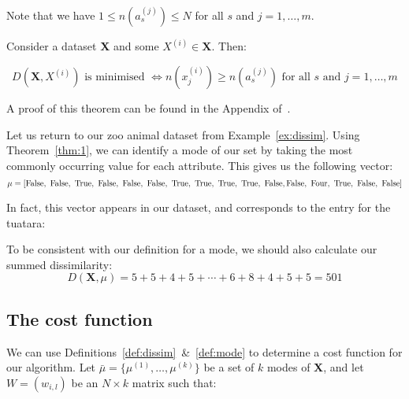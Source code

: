 \begin{remark}
    Note that we have \(1 \le n(a_s^{(j)}) \le N\) for all \(s\) and \(j = 1, 
    \ldots, m\).\\
\end{remark}

\begin{theorem}\label{thm:1}
    Consider a dataset \textbf{X} and some \(X^{(i)} \in \textbf{X}\). Then:
	
    \[
	    D(\textbf{X}, X^{(i)}) \text{ is minimised } \iff n(x_j^{(i)}) \geq 
	    n(a_s^{(j)}) \text{ for all } s \text{ and } j = 1, \ldots, m 
	\]
\end{theorem}
A proof of this theorem can be found in the Appendix of~\cite{Huang98}.\\

\begin{example}\label{ex:mode}
    Let us return to our zoo animal dataset from Example~\ref{ex:dissim}. Using 
    Theorem~\ref{thm:1}, we can identify a mode of our set by taking the most 
    commonly occurring value for each attribute. This gives us the following 
    vector:
    \[
        \mu = \left[\false, \ \false, \ \true, \ \false, \ \false, \ \false, \
        \true, \ \true, \ \true, \ \true, \ \false, \false, \ \text{Four}, \ 
        \true, \ \false, \ \false\right]
    \]

    In fact, this vector appears in our dataset, and corresponds to the entry 
    for the tuatara:
    
    \begin{table}[h]
        \resizebox{\textwidth}{!}{%
        \centering
        \label{tab:tuatara}
    }
    \end{table}

    To be consistent with our definition for a mode, we should also calculate 
    our summed dissimilarity:
    \[
        D(\textbf{X}, \mu) = 5 + 5 + 4 + 5 + \cdots + 6 + 8 + 4 + 5 + 5 = 501
    \]
\end{example}

\subsection{The cost function}\label{subsec:cost}

We can use Definitions~\ref{def:dissim}~\&~\ref{def:mode} to determine a cost 
function for our algorithm. Let \(\bar{\mu} = \{\mu^{(1)}, \ldots, \mu^{(k)}\}\) 
be a set of \(k\) modes of \textbf{X}, and let \(W = (w_{i,l})\) be an \(N 
\times k\) matrix such that:

